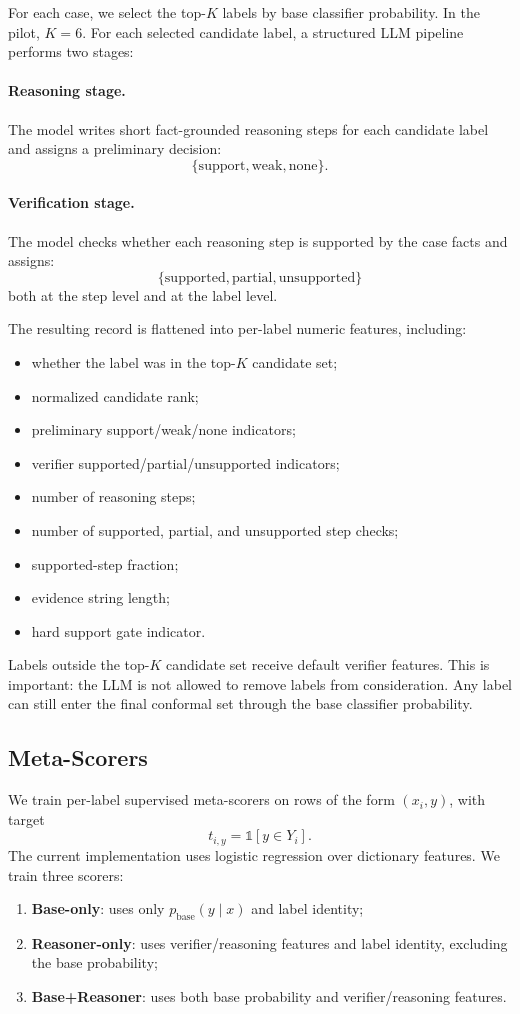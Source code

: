\documentclass[11pt]{article}
\begin{document}
For each case, we select the top-$K$ labels by base classifier probability. In the pilot, $K=6$. For each selected candidate label, a structured LLM pipeline performs two stages:

\paragraph{Reasoning stage.}
The model writes short fact-grounded reasoning steps for each candidate label and assigns a preliminary decision:
\[
\{\mathrm{support}, \mathrm{weak}, \mathrm{none}\}.
\]

\paragraph{Verification stage.}
The model checks whether each reasoning step is supported by the case facts and assigns:
\[
\{\mathrm{supported}, \mathrm{partial}, \mathrm{unsupported}\}
\]
both at the step level and at the label level.

The resulting record is flattened into per-label numeric features, including:
\begin{itemize}
  \item whether the label was in the top-$K$ candidate set;
  \item normalized candidate rank;
  \item preliminary support/weak/none indicators;
  \item verifier supported/partial/unsupported indicators;
  \item number of reasoning steps;
  \item number of supported, partial, and unsupported step checks;
  \item supported-step fraction;
  \item evidence string length;
  \item hard support gate indicator.
\end{itemize}

Labels outside the top-$K$ candidate set receive default verifier features. This is important: the LLM is not allowed to remove labels from consideration. Any label can still enter the final conformal set through the base classifier probability.

\subsection{Meta-Scorers}

We train per-label supervised meta-scorers on rows of the form $(x_i,y)$, with target
\[
  t_{i,y} = \mathbb{1}[y \in Y_i].
\]
The current implementation uses logistic regression over dictionary features. We train three scorers:
\begin{enumerate}
  \item \textbf{Base-only}: uses only $p_{\mathrm{base}}(y \mid x)$ and label identity;
  \item \textbf{Reasoner-only}: uses verifier/reasoning features and label identity, excluding the base probability;
  \item \textbf{Base+Reasoner}: uses both base probability and verifier/reasoning features.
\end{enumerate}
\end{document}
